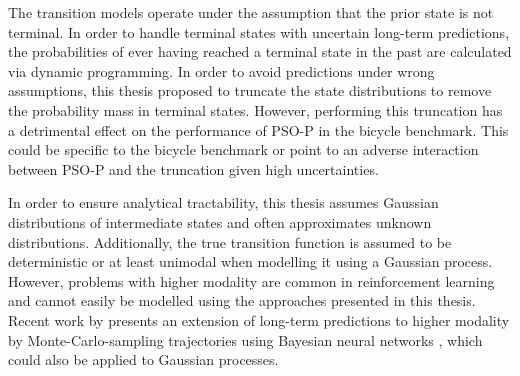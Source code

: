 The transition models operate under the assumption that the prior state is not terminal.
In order to handle terminal states with uncertain long-term predictions, the probabilities of ever having reached a terminal state in the past are calculated via dynamic programming.
In order to avoid predictions under wrong assumptions, this thesis proposed to truncate the state distributions to remove the probability mass in terminal states.
However, performing this truncation has a detrimental effect on the performance of PSO-P in the bicycle benchmark.
This could be specific to the bicycle benchmark or point to an adverse interaction between PSO-P and the truncation given high uncertainties.

In order to ensure analytical tractability, this thesis assumes Gaussian distributions of intermediate states and often approximates unknown distributions.
Additionally, the true transition function is assumed to be deterministic or at least unimodal when modelling it using a Gaussian process.
However, problems with higher modality are common in reinforcement learning and cannot easily be modelled using the approaches presented in this thesis.
Recent work by \citeauthor{depeweg_2016} presents an extension of long-term predictions to higher modality by Monte-Carlo-sampling trajectories using Bayesian neural networks \cite{depeweg_2016}, which could also be applied to Gaussian processes.
